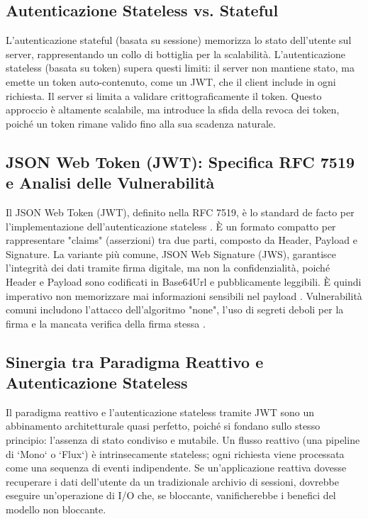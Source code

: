 \documentclass[12pt,a4paper,openright,twoside]{book}
\begin{document}
\subsection{Autenticazione Stateless vs. Stateful}
L'autenticazione stateful (basata su sessione) memorizza lo stato dell'utente sul server, rappresentando un collo di bottiglia per la scalabilità. L'autenticazione stateless (basata su token) supera questi limiti: il server non mantiene stato, ma emette un token auto-contenuto, come un JWT, che il client include in ogni richiesta. Il server si limita a validare crittograficamente il token. Questo approccio è altamente scalabile, ma introduce la sfida della revoca dei token, poiché un token rimane valido fino alla sua scadenza naturale.

\subsection{JSON Web Token (JWT): Specifica RFC 7519 e Analisi delle Vulnerabilità}
Il JSON Web Token (JWT), definito nella RFC 7519, è lo standard de facto per l'implementazione dell'autenticazione stateless \cite{rfc7519}. È un formato compatto per rappresentare "claims" (asserzioni) tra due parti, composto da Header, Payload e Signature. La variante più comune, JSON Web Signature (JWS), garantisce l'integrità dei dati tramite firma digitale, ma non la confidenzialità, poiché Header e Payload sono codificati in Base64Url e pubblicamente leggibili. È quindi imperativo non memorizzare mai informazioni sensibili nel payload \cite{rana2023enhancing}. Vulnerabilità comuni includono l'attacco dell'algoritmo "none", l'uso di segreti deboli per la firma e la mancata verifica della firma stessa \cite{owasp_jwt_cheatsheet}.

\subsection{Sinergia tra Paradigma Reattivo e Autenticazione Stateless}
Il paradigma reattivo e l'autenticazione stateless tramite JWT sono un abbinamento architetturale quasi perfetto, poiché si fondano sullo stesso principio: l'assenza di stato condiviso e mutabile. Un flusso reattivo (una pipeline di `Mono` o `Flux`) è intrinsecamente stateless; ogni richiesta viene processata come una sequenza di eventi indipendente. Se un'applicazione reattiva dovesse recuperare i dati dell'utente da un tradizionale archivio di sessioni, dovrebbe eseguire un'operazione di I/O che, se bloccante, vanificherebbe i benefici del modello non bloccante.
\end{document}
